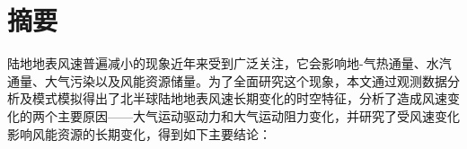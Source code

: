 \maketitle%
\MAKETITLE%
\makedeclaration%
\intobmk\chapter*{摘\quad 要}%
\setcounter{page}{1}%

陆地地表风速普遍减小的现象近年来受到广泛关注，它会影响地-气热通量、水汽通量、大气污染以及风能资源储量。为了全面研究这个现象，本文通过观测数据分析及模式模拟得出了北半球陆地地表风速长期变化的时空特征，分析了造成风速变化的两个主要原因——大气运动驱动力和大气运动阻力变化，并研究了受风速变化影响风能资源的长期变化，得到如下主要结论：

